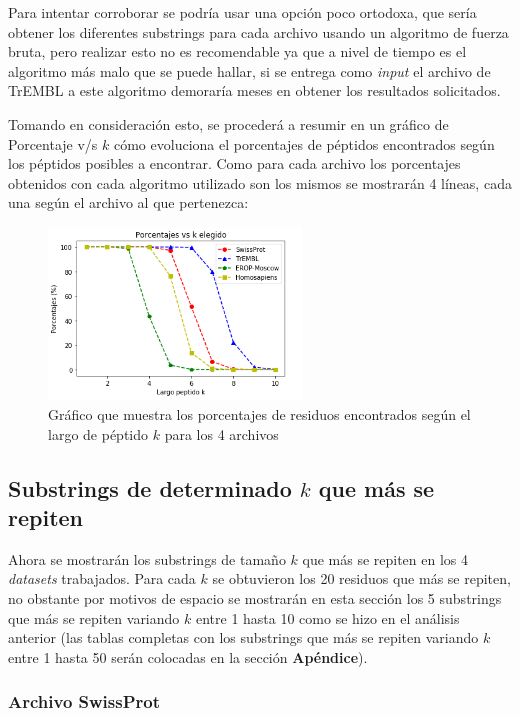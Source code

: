 Para intentar corroborar se podría usar una opción poco ortodoxa, que sería obtener los diferentes substrings para cada archivo usando un algoritmo de fuerza bruta, pero realizar esto no es recomendable ya que a nivel de tiempo es el algoritmo más malo que se puede hallar, si se entrega como \textit{input} el archivo de TrEMBL a este algoritmo demoraría meses en obtener los resultados solicitados.

Tomando en consideración esto, se procederá a resumir en un gráfico de Porcentaje v/s $k$ cómo evoluciona el porcentajes de péptidos encontrados según los péptidos posibles a encontrar. Como para cada archivo los porcentajes obtenidos con cada algoritmo utilizado son los mismos se mostrarán 4 líneas, cada una según el archivo al que pertenezca:

\begin{figure}[h]
    \centering
    \includegraphics[width=0.6\textwidth]{./images/grafico1v1.png}
    \caption{Gráfico que muestra los porcentajes de residuos encontrados según el largo de péptido $k$ para los 4 archivos}
    \label{fig:imple2}
\end{figure}


\subsection{Substrings de determinado $k$ que más se repiten}

Ahora se mostrarán los substrings de tamaño $k$ que más se repiten en los 4 \textit{datasets} trabajados. Para cada $k$ se obtuvieron los 20 residuos que más se repiten, no obstante por motivos de espacio se mostrarán en esta sección los 5 substrings que más se repiten variando $k$ entre 1 hasta 10 como se hizo en el análisis anterior (las tablas completas con los substrings que más se repiten variando $k$ entre 1 hasta 50 serán colocadas en la sección \textbf{Apéndice}).

\subsubsection{Archivo SwissProt}

